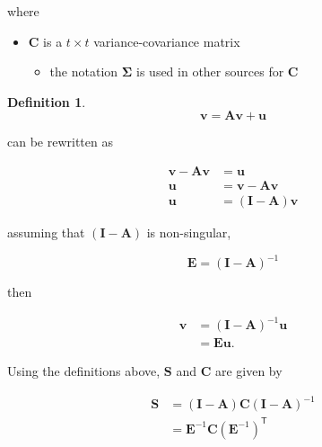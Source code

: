 \documentclass[
]{book}
\providecommand{\tightlist}{%
  \setlength{\itemsep}{0pt}\setlength{\parskip}{0pt}}
\theoremstyle{definition}
\newtheorem{definition}{Definition}[chapter]
\theoremstyle{definition}
\theoremstyle{definition}
\theoremstyle{remark}
\begin{document}
\noindent where

\begin{itemize}
\tightlist
\item
  \(\mathbf{C}\) is a \(t \times t\) variance-covariance matrix

  \begin{itemize}
  \tightlist
  \item
    the notation \(\boldsymbol{\Sigma}\) is used in other sources for \(\mathbf{C}\)
  \end{itemize}
\end{itemize}

\begin{definition}
\protect\hypertarget{def:unnamed-chunk-5}{}{\label{def:unnamed-chunk-5} }\begin{equation*}
  \mathbf{v}
  =
  \mathbf{A} \mathbf{v} + \mathbf{u}
\end{equation*}

\noindent can be rewritten as

\begin{equation}
  \begin{split}
    \mathbf{v} - \mathbf{A} \mathbf{v}
    &=
    \mathbf{u} \\
    \mathbf{u}
    &=
    \mathbf{v} - \mathbf{A} \mathbf{v} \\
    \mathbf{u}
    &=
    \left( \mathbf{I} - \mathbf{A} \right) \mathbf{v}
  \end{split}
\end{equation}

\noindent assuming that \(\left( \mathbf{I} - \mathbf{A} \right)\) is non-singular,

\begin{equation}
  \mathbf{E}
  =
  \left( \mathbf{I} - \mathbf{A} \right)^{-1}
\end{equation}

\noindent then

\begin{equation}
  \begin{split}
    \mathbf{v}
    &=
    \left( \mathbf{I} - \mathbf{A} \right)^{-1} \mathbf{u} \\
    &=
    \mathbf{E} \mathbf{u} .
  \end{split}
\end{equation}
\end{definition}

Using the definitions above,
\(\mathbf{S}\) and \(\mathbf{C}\)
are given by

\begin{equation}
  \begin{split}
    \mathbf{S}
    &=
    \left( \mathbf{I} - \mathbf{A} \right)
    \mathbf{C}
    \left( \mathbf{I} - \mathbf{A} \right)^{-1} \\
    &=
    \mathbf{E}^{-1} \mathbf{C} \left( \mathbf{E}^{-1} \right)^{\mathsf{T}}
    \end{split}
\end{equation}
\end{document}
